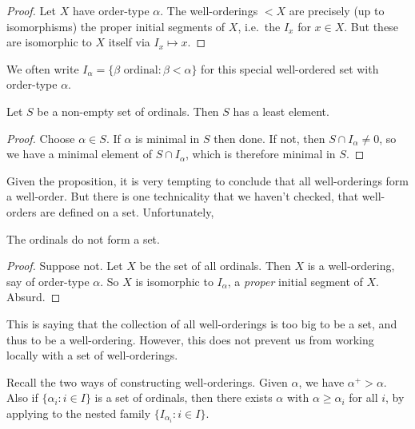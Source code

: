 \documentclass[a4paper]{article}
\begin{document}
\begin{proof}
  Let \(X\) have order-type \(\alpha\). The well-orderings \(< X\) are precisely (up to isomorphisms) the proper initial segments of \(X\), i.e.\ the \(I_x\) for \(x \in X\). But these are isomorphic to \(X\) itself via \(I_x \mapsto x\).
\end{proof}

\begin{notation}
  We often write \(I_\alpha = \{\beta \text{ ordinal}: \beta < \alpha\}\) for this special well-ordered set with order-type \(\alpha\).
\end{notation}

\begin{proposition}
  \label{prop:set of ordinals is well-ordered}
  Let \(S\) be a non-empty set of ordinals. Then \(S\) has a least element.
\end{proposition}

\begin{proof}
  Choose \(\alpha \in S\). If \(\alpha\) is minimal in \(S\) then done. If not, then \(S \cap I_\alpha \neq 0\), so we have a minimal element of \(S \cap I_\alpha\), which is therefore minimal in \(S\).
\end{proof}

Given the proposition, it is very tempting to conclude that all well-orderings form a well-order. But there is one technicality that we haven't checked, that well-orders are defined on a set. Unfortunately,

\begin{theorem}
  The ordinals do not form a set.
\end{theorem}

\begin{proof}
  Suppose not. Let \(X\) be the set of all ordinals. Then \(X\) is a well-ordering, say of order-type \(\alpha\). So \(X\) is isomorphic to \(I_\alpha\), a \emph{proper} initial segment of \(X\). Absurd.
\end{proof}

This is saying that the collection of all well-orderings is too big to be a set, and thus to be a well-ordering. However, this does not prevent us from working locally with a set of well-orderings.

Recall the two ways of constructing well-orderings. Given \(\alpha\), we have \(\alpha^+ > \alpha\). Also if \(\{\alpha_i: i \in I\}\) is a set of ordinals, then there exists \(\alpha\) with \(\alpha \geq \alpha_i\) for all \(i\), by applying  to the nested family \(\{I_{\alpha_i}: i \in I\}\).
\end{document}
